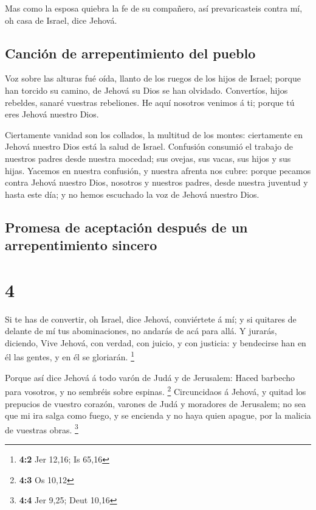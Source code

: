  Mas como la esposa quiebra la fe de su compañero, así
prevaricasteis contra mí, oh casa de Israel, dice Jehová.

\hypertarget{canciuxf3n-de-arrepentimiento-del-pueblo}{%
\subsection{Canción de arrepentimiento del
pueblo}\label{canciuxf3n-de-arrepentimiento-del-pueblo}}

 Voz sobre las alturas fué oída, llanto de los ruegos de
los hijos de Israel; porque han torcido su camino, de Jehová su Dios se
han olvidado.  Convertíos, hijos rebeldes, sanaré vuestras
rebeliones. He aquí nosotros venimos á ti; porque tú eres Jehová nuestro
Dios.

 Ciertamente vanidad son los collados, la multitud de los
montes: ciertamente en Jehová nuestro Dios está la salud de Israel.
 Confusión consumió el trabajo de nuestros padres desde
nuestra mocedad; sus ovejas, sus vacas, sus hijos y sus hijas.
 Yacemos en nuestra confusión, y nuestra afrenta nos cubre:
porque pecamos contra Jehová nuestro Dios, nosotros y nuestros padres,
desde nuestra juventud y hasta este día; y no hemos escuchado la voz de
Jehová nuestro Dios.

\hypertarget{promesa-de-aceptaciuxf3n-despuuxe9s-de-un-arrepentimiento-sincero}{%
\subsection{Promesa de aceptación después de un arrepentimiento
sincero}\label{promesa-de-aceptaciuxf3n-despuuxe9s-de-un-arrepentimiento-sincero}}

\hypertarget{section-3}{%
\section{4}\label{section-3}}

 Si te has de convertir, oh Israel, dice Jehová, conviértete
á mí; y si quitares de delante de mí tus abominaciones, no andarás de
acá para allá.  Y jurarás, diciendo, Vive Jehová, con
verdad, con juicio, y con justicia: y bendecirse han en él las gentes, y
en él se gloriarán. \footnote{\textbf{4:2} Jer 12,16; Is 65,16}

 Porque así dice Jehová á todo varón de Judá y de Jerusalem:
Haced barbecho para vosotros, y no sembréis sobre espinas. \footnote{\textbf{4:3}
  Os 10,12}  Circuncidaos á Jehová, y quitad los prepucios
de vuestro corazón, varones de Judá y moradores de Jerusalem; no sea que
mi ira salga como fuego, y se encienda y no haya quien apague, por la
malicia de vuestras obras. \footnote{\textbf{4:4} Jer 9,25; Deut 10,16}

